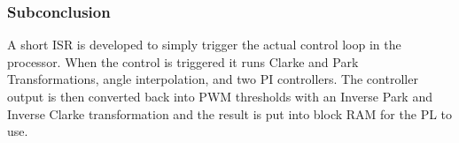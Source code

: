









\subsubsection*{Subconclusion}
A short ISR is developed to simply trigger the actual control loop in the processor. When the control is triggered it runs Clarke and Park Transformations, angle interpolation, and two PI controllers. The controller output is then converted back into PWM thresholds with an Inverse Park and Inverse Clarke transformation and the result is put into block RAM for the PL to use.

